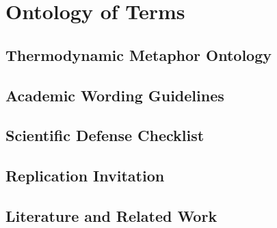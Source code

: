 \part{Ontology of Terms}

\chapter{Thermodynamic Metaphor Ontology}



\chapter{Academic Wording Guidelines}


\appendix

\chapter{Scientific Defense Checklist}



\chapter{Replication Invitation}


\chapter{Literature and Related Work}



\backmatter





